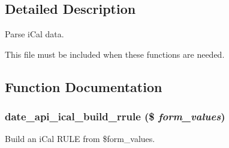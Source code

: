 \subsection{Detailed Description}
Parse iCal data.

This file must be included when these functions are needed. 

\subsection{Function Documentation}
\hypertarget{date__api__ical_8inc_ad49735896adc89955afb8e8df6d16b51}{
\subsubsection[{date\_\-api\_\-ical\_\-build\_\-rrule}]{\setlength{\rightskip}{0pt plus 5cm}date\_\-api\_\-ical\_\-build\_\-rrule (\$ {\em form\_\-values})}}
\label{date__api__ical_8inc_ad49735896adc89955afb8e8df6d16b51}
Build an iCal RULE from \$form\_\-values.


